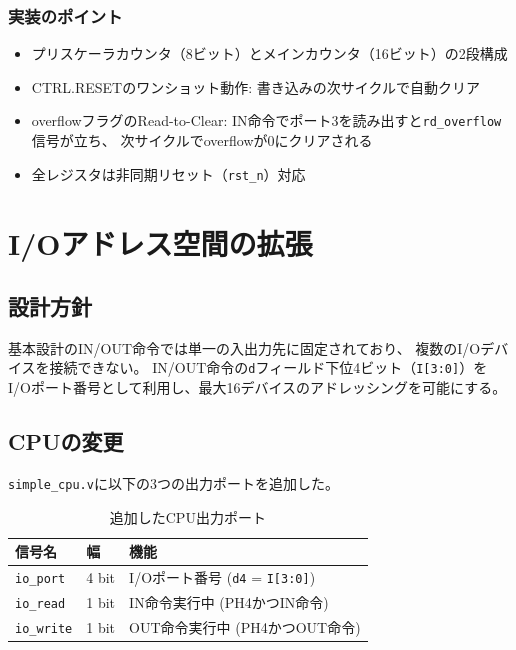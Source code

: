 \documentclass[a4paper,11pt]{ltjsarticle}
\begin{document}
\subsubsection{実装のポイント}

\begin{itemize}
\item プリスケーラカウンタ（8ビット）とメインカウンタ（16ビット）の2段構成
\item CTRL.RESETのワンショット動作: 書き込みの次サイクルで自動クリア
\item overflowフラグのRead-to-Clear:
      IN命令でポート3を読み出すと\texttt{rd\_overflow}信号が立ち、
      次サイクルでoverflowが0にクリアされる
\item 全レジスタは非同期リセット（\texttt{rst\_n}）対応
\end{itemize}


\section{I/Oアドレス空間の拡張}

\subsection{設計方針}

基本設計のIN/OUT命令では単一の入出力先に固定されており、
複数のI/Oデバイスを接続できない。
IN/OUT命令の\texttt{d}フィールド下位4ビット（\texttt{I[3:0]}）を
I/Oポート番号として利用し、最大16デバイスのアドレッシングを可能にする。

\subsection{CPUの変更}

\texttt{simple\_cpu.v}に以下の3つの出力ポートを追加した。

\begin{table}[h]
\centering
\caption{追加したCPU出力ポート}
\begin{tabular}{lll}
\toprule
信号名 & 幅 & 機能 \\
\midrule
\texttt{io\_port}  & 4 bit & I/Oポート番号 (\texttt{d4} = \texttt{I[3:0]}) \\
\texttt{io\_read}  & 1 bit & IN命令実行中 (PH4かつIN命令) \\
\texttt{io\_write} & 1 bit & OUT命令実行中 (PH4かつOUT命令) \\
\bottomrule
\end{tabular}
\end{table}
\end{document}
